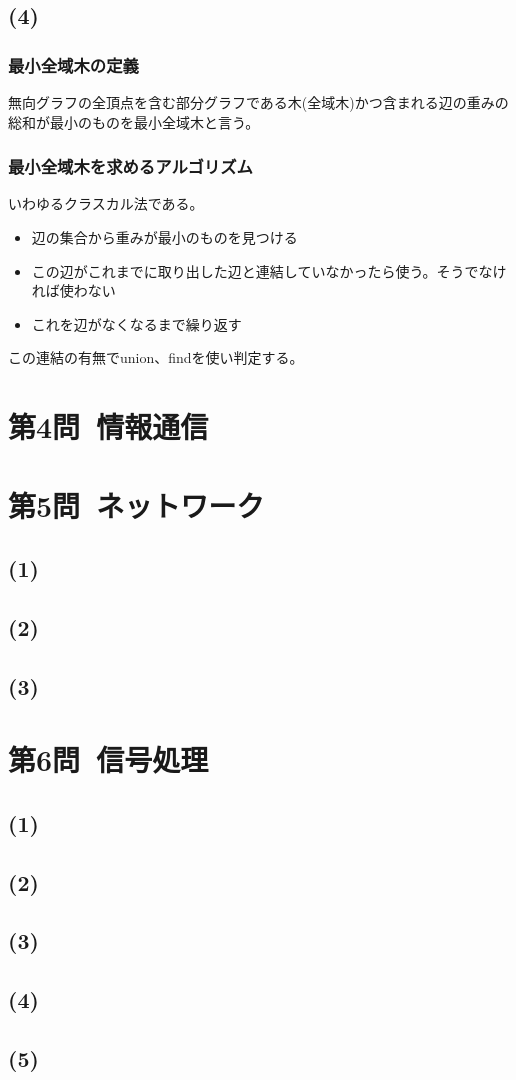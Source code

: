 \documentclass[a4paper,12pt,xelatex,ja=standard]{bxjsarticle}
\begin{document}
\subsection*{(4)}
\subsubsection*{最小全域木の定義}
無向グラフの全頂点を含む部分グラフである木(全域木)かつ含まれる辺の重みの総和が最小のものを最小全域木と言う。

\subsubsection*{最小全域木を求めるアルゴリズム}
いわゆるクラスカル法である。
\begin{itemize}
  \item 辺の集合から重みが最小のものを見つける
  \item この辺がこれまでに取り出した辺と連結していなかったら使う。そうでなければ使わない
  \item これを辺がなくなるまで繰り返す
\end{itemize}

この連結の有無でunion、findを使い判定する。

\section*{第4問\ 情報通信}

\section*{第5問\ ネットワーク}
\subsection*{(1)}

\subsection*{(2)}

\subsection*{(3)}

\section*{第6問\ 信号処理}
\subsection*{(1)}

\subsection*{(2)}

\subsection*{(3)}

\subsection*{(4)}

\subsection*{(5)}
\end{document}
